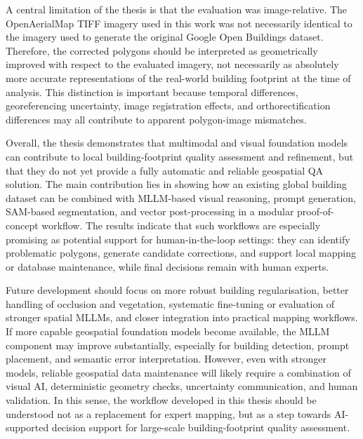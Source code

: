 A central limitation of the thesis is that the evaluation was image-relative. The OpenAerialMap TIFF imagery used in this work was not necessarily identical to the imagery used to generate the original Google Open Buildings dataset. Therefore, the corrected polygons should be interpreted as geometrically improved with respect to the evaluated imagery, not necessarily as absolutely more accurate representations of the real-world building footprint at the time of analysis. This distinction is important because temporal differences, georeferencing uncertainty, image registration effects, and orthorectification differences may all contribute to apparent polygon-image mismatches.

Overall, the thesis demonstrates that multimodal and visual foundation models can contribute to local building-footprint quality assessment and refinement, but that they do not yet provide a fully automatic and reliable geospatial QA solution. The main contribution lies in showing how an existing global building dataset can be combined with MLLM-based visual reasoning, prompt generation, SAM-based segmentation, and vector post-processing in a modular proof-of-concept workflow. The results indicate that such workflows are especially promising as potential support for human-in-the-loop settings: they can identify problematic polygons, generate candidate corrections, and support local mapping or database maintenance, while final decisions remain with human experts.

Future development should focus on more robust building regularisation, better handling of occlusion and vegetation, systematic fine-tuning or evaluation of stronger spatial MLLMs, and closer integration into practical mapping workflows. If more capable geospatial foundation models become available, the MLLM component may improve substantially, especially for building detection, prompt placement, and semantic error interpretation. However, even with stronger models, reliable geospatial data maintenance will likely require a combination of visual AI, deterministic geometry checks, uncertainty communication, and human validation. In this sense, the workflow developed in this thesis should be understood not as a replacement for expert mapping, but as a step towards AI-supported decision support for large-scale building-footprint quality assessment.

